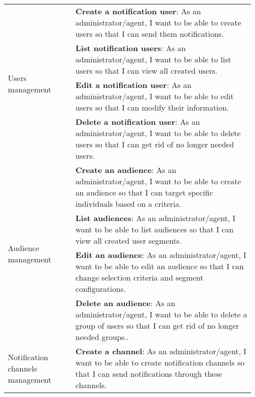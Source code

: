 \begin{longtable}{ | m{}  | m{} | }
      \hline
      \multirow[t]{4}{5em}{Users management}                  & \textbf{Create a notification user}: As an administrator/agent, I want to be able to create users so that I can send them notifications.                                                      \\
      \cline{2-2}
                                                              & \textbf{List notification users}: As an administrator/agent, I want to be able to list users so that I can view all created users.                                                            \\
      \cline{2-2}
                                                              & \textbf{Edit a notification user}: As an administrator/agent, I want to be able to edit users so that I can modify their information.                                                         \\
      \cline{2-2}
                                                              & \textbf{Delete a notification user}: As an administrator/agent, I want to be able to delete users so that I can get rid of no longer needed users.                                            \\
      \hline
      \multirow[t]{4}{5em}{Audience management}               & \textbf{Create an audience}: As an administrator/agent, I want to be able to create an audience so that I can target specific individuals based on a criteria.                                \\
      \cline{2-2}
                                                              & \textbf{List audiences}: As an administrator/agent, I want to be able to list audiences so that I can view all created user segments.                                                         \\
      \cline{2-2}
                                                              & \textbf{Edit an audience}: As an administrator/agent, I want to be able to edit an audience so that I can change selection criteria and segment configurations.                               \\
      \cline{2-2}
                                                              & \textbf{Delete an audience}: As an administrator/agent, I want to be able to delete a group of users so that I can get rid of no longer needed groups..                                       \\
      \hline
      \multirow[t]{4}{5em}{Notification channels management}  & \textbf{Create a channel}: As an administrator/agent, I want to be able to create notification channels so that I can send notifications through these channels.                              \\

\end{longtable}
